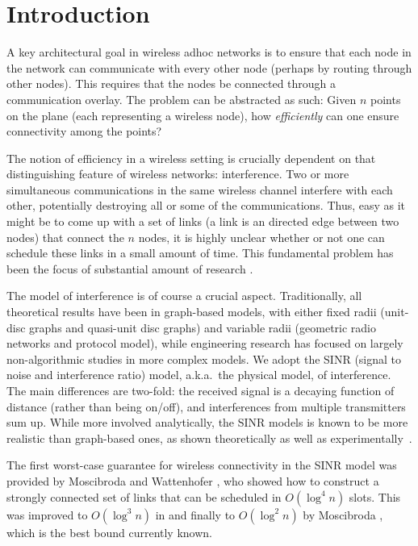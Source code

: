 \documentclass[11pt]{amsart}
\begin{document}
 


\section{Introduction}
A key architectural goal in wireless adhoc networks is to ensure that
each node in the network can communicate with every other node
(perhaps by routing through other nodes). This requires that the nodes
be connected through a communication overlay.  The problem can be
abstracted as such: Given $n$ points on the plane (each representing a
wireless node), how \emph{efficiently} can one ensure connectivity
among the points?

The notion of efficiency in a wireless setting is crucially dependent on that distinguishing feature
of wireless networks: interference. Two or more simultaneous communications in the
same wireless channel interfere with each other, potentially destroying all or some of the communications.
Thus, easy as it might be to come up with a set of links (a link is an directed edge between two nodes) that connect the $n$ nodes, it is highly 
unclear whether or not one can schedule these links in a small amount of time. 
This fundamental problem has been
the focus of substantial amount of research \cite{MoWa06,moscibroda06b,Moscibroda07,kumar2005,Dousse03impactof}.

The model of interference is of course a crucial
aspect. Traditionally, all theoretical results have been in graph-based
models, with either fixed radii (unit-disc graphs and quasi-unit
disc graphs) and variable radii (geometric radio networks and
protocol model), 
while engineering research has focused on largely non-algorithmic 
studies in more complex models.
We adopt the SINR (signal to noise and interference ratio) model,
a.k.a.\ the physical model, of interference. The main differences are
two-fold: the received signal is a decaying function of distance (rather than
being on/off), and interferences from multiple transmitters sum up.
While more involved analytically, the SINR models is known to
be more realistic than graph-based ones, as shown theoretically as well as
experimentally~\cite{GronkMibiHoc01,MaheshwariJD08,Moscibroda2006Protocol}.

The first worst-case guarantee for wireless connectivity 
in the SINR model was provided by Moscibroda and
Wattenhofer \cite{MoWa06}, who showed how to construct a strongly
connected set of links that can 
be scheduled in $O(\log^4 n)$ slots. This was improved to $O(\log^3
n)$ in \cite{moscibroda06b} and finally 
to $O(\log^2 n)$ by Moscibroda \cite{Moscibroda07}, which is the 
best bound currently known.
\end{document}
